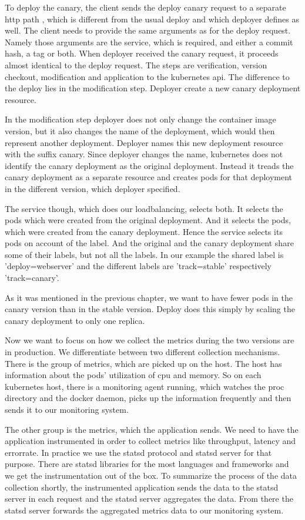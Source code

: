 To deploy the canary, the client sends the deploy canary request to a separate http path ,
which is different from the usual deploy and which deployer defines as well. The client
needs to provide the same arguments as for the deploy request. Namely those arguments are
the service, which is required, and either a commit hash, a tag or both. When deployer
received the canary request, it proceeds almost identical to the deploy request. The steps
are verification, version checkout, modification and application to the kubernetes
api. The difference to the deploy lies in the modification step. Deployer create a new
canary deployment resource.

In the modification step deployer does not only change the container image version, but it
also changes the name of the deployment, which would then represent another
deployment. Deployer names this new deployment resource with the suffix canary. Since
deployer changes the name, kubernetes does not identify the canary deployment as the
original deployment. Instead it treads the canary deployment as a separate resource and
creates pods for that deployment in the different version, which deployer specified.

The service though, which does our loadbalancing, selects both. It selects the pods which
were created from the original deployment. And it selects the pods, which were created
from the canary deployment. Hence the service selects its pods on account of the
label. And the original and the canary deployment share some of their labels, but not all
the labels. In our example the shared label is 'deploy=webserver' and the different labels
are 'track=stable' respectively 'track=canary'.

As it was mentioned in the previous chapter, we want to have fewer pods in the canary
version than in the stable version. Deploy does this simply by scaling the canary
deployment to only one replica.

Now we want to focus on how we collect the metrics during the two versions are in
production. We differentiate between two different collection mechanisms. There is the
group of metrics, which are picked up on the host. The host has information about the
pods' utilization of cpu and memory. So on each kubernetes host, there is a monitoring
agent running, which watches the proc directory and the docker daemon, picks up the
information frequently and then sends it to our monitoring system.

The other group is the metrics, which the application sends. We need to have the
application instrumented in order to collect metrics like throughput, latency and
errorrate. In practice we use the statsd protocol and statsd server for that
purpose. There are statsd libraries for the most languages and frameworks and we get the
instrumentation out of the box. To summarize the process of the data collection shortly,
the instrumented application sends the data to the statsd server in each request and the
statsd server aggregates the data. From there the statsd server forwards the aggregated
metrics data to our monitoring system.


